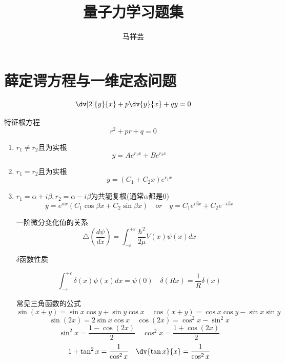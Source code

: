 

\title{量子力学习题集}
\author{马祥芸}


    \maketitle
    \tableofcontents
    \newpage

    \section{薛定谔方程与一维定态问题}

        \begin{formal}
            $$ \dv[2]{y}{x} + p\dv{y}{x} + qy = 0 $$
            
            特征根方程
            $$ r^{2} + pr + q = 0 $$

            \begin{enumerate}
                \item $r_{1} \neq r_{2}$且为实根
                $$ y = Ae^{r_{1}x} + Be^{r_{2}x} $$
                \item $r_{1} = r_{2}$且为实根
                $$ y = (C_{1}+C_{2}x)e^{r_{1}x} $$
                \item $r_{1}=\alpha + i \beta,r_{2} = \alpha - i \beta $为共轭复根(通常$\alpha$都是0)
                $$ y = e^{\alpha x} (C_{1}\cos{\beta x} + C_{2}\sin{\beta x}) \quad or \quad y = C_{1}e^{i\beta x} + C_{2}e^{-i\beta x}$$

                一阶微分变化值的关系
                $$ \triangle(\frac{d\psi}{dx}) = \int_{-\varepsilon}^{+\varepsilon}\frac{\hbar^2}{2\mu}V(x)\psi(x)dx $$    

                $\delta$函数性质

                $$\int_{-\varepsilon}^{+\varepsilon} \delta(x) \psi(x) dx =\psi(0) \quad \delta(Rx) = \frac{1}{R} \delta(x) $$

                常见三角函数的公式
                $$\sin(x+y)=\sin{x} \cos{y}+\sin{y}\cos{x} \quad \cos(x+y)=\cos{x} \cos{y} - \sin{x}\sin{y}$$ 
                $$\sin(2x) = 2\sin{x} \cos{x} \quad \cos(2x) = \cos^{2}{x} - \sin^{2}{x} $$
                $$\sin^{2}{x}=\frac{1-\cos(2x)}{2} \quad \cos^{2}{x}=\frac{1+\cos(2x)}{2} $$
                $$ 1 + \tan^{2}{x} = \frac{1}{\cos^{2}{x}} \quad \dv{\tan{x}}{x} = \frac{1}{\cos^{2}{x}} $$


\end{enumerate}
\end{formal}
